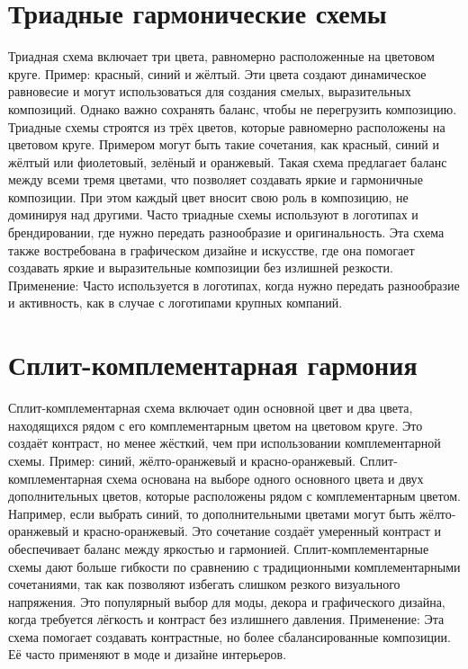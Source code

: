 \documentclass[bachelor, och, referat]{SCWorks}
\begin{document}
\section{Триадные гармонические схемы}
Триадная схема включает три цвета, равномерно расположенные на цветовом круге. Пример: красный, синий и жёлтый. Эти цвета создают динамическое равновесие и могут использоваться для создания смелых, выразительных композиций. Однако важно сохранять баланс, чтобы не перегрузить композицию.
Триадные схемы строятся из трёх цветов, которые равномерно расположены на цветовом круге. Примером могут быть такие сочетания, как красный, синий и жёлтый или фиолетовый, зелёный и оранжевый. Такая схема предлагает баланс между всеми тремя цветами, что позволяет создавать яркие и гармоничные композиции. При этом каждый цвет вносит свою роль в композицию, не доминируя над другими.
Часто триадные схемы используют в логотипах и брендировании, где нужно передать разнообразие и оригинальность. Эта схема также востребована в графическом дизайне и искусстве, где она помогает создавать яркие и выразительные композиции без излишней резкости.
Применение: Часто используется в логотипах, когда нужно передать разнообразие и активность, как в случае с логотипами крупных компаний.

\section{Сплит-комплементарная гармония}
Сплит-комплементарная схема включает один основной цвет и два цвета, находящихся рядом с его комплементарным цветом на цветовом круге. Это создаёт контраст, но менее жёсткий, чем при использовании комплементарной схемы. Пример: синий, жёлто-оранжевый и красно-оранжевый.
Сплит-комплементарная схема основана на выборе одного основного цвета и двух дополнительных цветов, которые расположены рядом с комплементарным цветом. Например, если выбрать синий, то дополнительными цветами могут быть жёлто-оранжевый и красно-оранжевый. Это сочетание создаёт умеренный контраст и обеспечивает баланс между яркостью и гармонией.
Сплит-комплементарные схемы дают больше гибкости по сравнению с традиционными комплементарными сочетаниями, так как позволяют избегать слишком резкого визуального напряжения. Это популярный выбор для моды, декора и графического дизайна, когда требуется лёгкость и контраст без излишнего давления.
Применение: Эта схема помогает создавать контрастные, но более сбалансированные композиции. Её часто применяют в моде и дизайне интерьеров.
\end{document}

